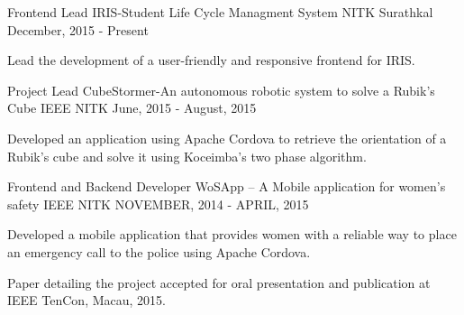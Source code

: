 \begin{cventries}
  \cventry
    {Frontend Lead}
    {IRIS-Student Life Cycle Managment System}
    {NITK Surathkal}
    {December, 2015 - Present}
    {
      \begin{cvitems}
        \item {Lead the development of a user-friendly and responsive frontend for IRIS.}
      \end{cvitems}
    }
  \cventry
    {Project Lead}
    {CubeStormer-An autonomous robotic system to solve a Rubik's Cube}
    {IEEE NITK}
    {June, 2015 - August, 2015}
    {
      \begin{cvitems}
        \item {Developed an application using Apache Cordova to retrieve the orientation of a Rubik's cube and solve it using Koceimba's two phase algorithm.}
      \end{cvitems}
    }
  \cventry
    {Frontend and Backend Developer}
    {WoSApp – A Mobile application for women's safety}
    {IEEE NITK}
    {NOVEMBER, 2014 - APRIL, 2015}
    {
      \begin{cvitems}
        \item {Developed a mobile application that provides women with a reliable way to place an emergency call to the police using Apache Cordova.}
        \item {Paper detailing the project accepted for oral presentation and publication at IEEE TenCon, Macau, 2015.}
      \end{cvitems}
    }
\end{cventries}
